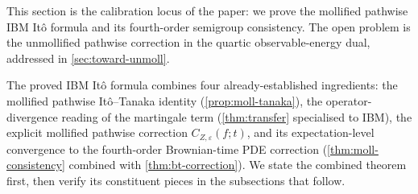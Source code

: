 \documentclass[11pt,reqno]{amsart}
\theoremstyle{plain}
\theoremstyle{definition}
\theoremstyle{remark}
\newcommand{\IBM}{Z}
\begin{document}
This section is the calibration locus of the paper: we prove the
mollified pathwise IBM It\^o formula and its fourth-order semigroup
consistency. The open problem is the unmollified pathwise correction
in the quartic observable-energy dual, addressed in
\cref{sec:toward-unmoll}.

The proved IBM It\^o formula combines four already-established
ingredients: the mollified pathwise It\^o--Tanaka identity
(\cref{prop:moll-tanaka}), the operator-divergence reading of the
martingale term (\cref{thm:transfer} specialised to IBM), the
explicit mollified pathwise correction
$C_{\IBM,\varepsilon}(f;t)$, and its expectation-level convergence
to the fourth-order Brownian-time PDE correction
(\cref{thm:moll-consistency} combined with \cref{thm:bt-correction}).
We state the combined theorem first, then verify its constituent
pieces in the subsections that follow.
\end{document}
